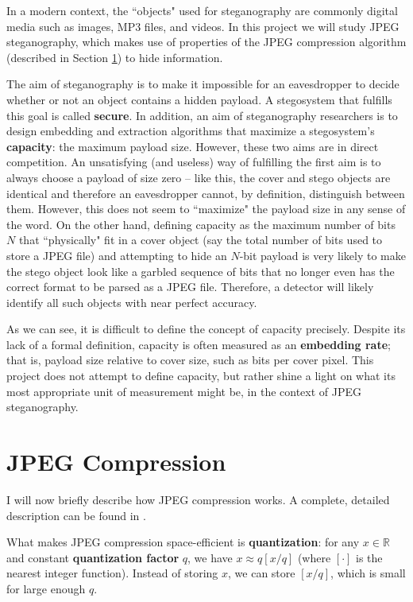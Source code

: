 \documentclass[11pt,a4paper,twoside,openright]{report}
\begin{document}
In a modern context, the ``objects" used for steganography are commonly digital media such as images, MP3 files, and videos. In this project we will study JPEG steganography, which makes use of properties of the JPEG compression algorithm (described in Section \ref{sec:jpeg-compression}) to hide information.

The aim of steganography is to make it impossible for an eavesdropper to decide whether or not an object contains a hidden payload. A stegosystem that fulfills this goal is called \textbf{secure}. In addition, an aim of steganography researchers is to design embedding and extraction algorithms that maximize a stegosystem's \textbf{capacity}: the maximum payload size. However, these two aims are in direct competition. An unsatisfying (and useless) way of fulfilling the first aim is to always choose a payload of size zero -- like this, the cover and stego objects are identical and therefore an eavesdropper cannot, by definition, distinguish between them. However, this does not seem to ``maximize" the payload size in any sense of the word. On the other hand, defining capacity as the maximum number of bits $N$ that ``physically" fit in a cover object (say the total number of bits used to store a JPEG file) and attempting to hide an $N$-bit payload is very likely to make the stego object look like a garbled sequence of bits that no longer even has the correct format to be parsed as a JPEG file. Therefore, a detector will likely identify all such objects with near perfect accuracy.

As we can see, it is difficult to define the concept of capacity precisely. Despite its lack of a formal definition, capacity is often measured as an \textbf{embedding rate}; that is, payload size relative to cover size, such as bits per cover pixel. This project does not attempt to define capacity, but rather shine a light on what its most appropriate unit of measurement might be, in the context of JPEG steganography. 


\section{JPEG Compression} \label{sec:jpeg-compression}

I will now briefly describe how JPEG compression works. A complete, detailed description can be found in \cite{jpeg-standard}.

What makes JPEG compression space-efficient is \textbf{quantization}: for any $x \in \mathbb{R}$ and constant \textbf{quantization factor} $q$, we have $x \approx q [x/q]$ (where $[ \cdot ]$ is the nearest integer function). Instead of storing $x$, we can store $[x/q]$, which is small for large enough $q$.
\end{document}
